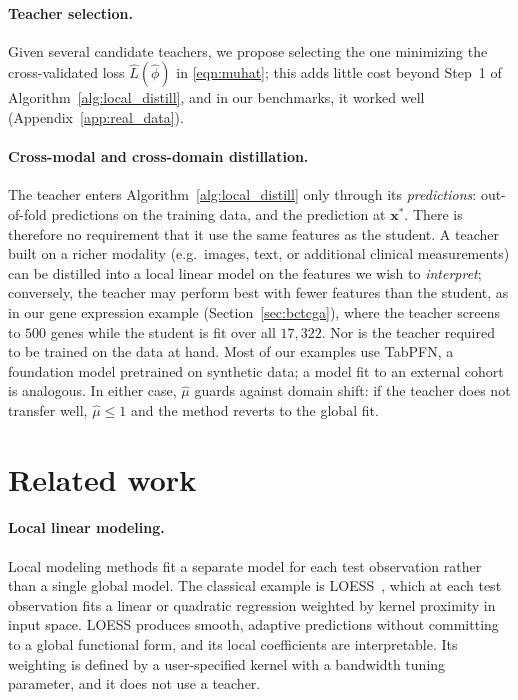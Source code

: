 \documentclass[12pt]{article}
\theoremstyle{definition}
\begin{document}
\paragraph{Teacher selection.} Given several candidate teachers, we propose selecting the one minimizing the cross-validated loss $\hat{L}(\hat\phi)$ in \eqref{eqn:muhat}; this adds little cost beyond Step~1 of Algorithm~\ref{alg:local_distill}, and in our benchmarks, it worked well (Appendix~\ref{app:real_data}).

\paragraph{Cross-modal and cross-domain distillation.} The teacher enters Algorithm~\ref{alg:local_distill} only through its \textit{predictions}: out-of-fold predictions on the training data, and the prediction at $\bm{x}^*$. There is therefore no requirement that it use the same features as the student. A teacher built on a richer modality (e.g.\ images, text, or additional clinical measurements) can be distilled into a local linear model on the features we wish to \textit{interpret}; conversely, the teacher may perform best with fewer features than the student, as in our gene expression example (Section~\ref{sec:bctcga}), where the teacher screens to $500$ genes while the student is fit over all $17{,}322$.
Nor is the teacher required to be trained on the data at hand. Most of our examples use TabPFN, a foundation model pretrained on synthetic data; a model fit to an external cohort is analogous. In either case, $\hat\mu$ guards against domain shift: if the teacher does not transfer well, $\hat\mu \le 1$ and the method reverts to the global fit.

\section{Related work}
\label{sec:rel_work}

\paragraph{Local linear modeling.}
Local modeling methods fit a separate model for each test observation rather than a single global model. The classical example is LOESS~\cite{cleveland1988locally}, which at each test observation fits a linear or quadratic regression weighted by kernel proximity in input space. LOESS produces smooth, adaptive predictions without committing to a global functional form, and its local coefficients are interpretable. Its weighting is defined by a user-specified kernel with a bandwidth tuning parameter, and it does not use a teacher.
\end{document}
